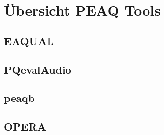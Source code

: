 \chapter{\"Ubersicht PEAQ Tools}
\label{ch:peaq}

\section{EAQUAL}

\section{PQevalAudio}

\section{peaqb}

\section{OPERA}





